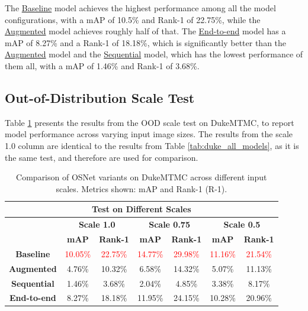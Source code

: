 \noindent The \hyperlink{model:baseline}{Baseline} model achieves the highest performance among all the model configurations, with a \acs{mAP} of 10.5\% and Rank-1 of 22.75\%, while the \hyperlink{model:augmented}{Augmented} model achieves roughly half of that. The \hyperlink{model:endtoend}{End-to-end} model has a \acs{mAP} of 8.27\% and a Rank-1 of 18.18\%, which is significantly better than the \hyperlink{model:augmented}{Augmented} model and the \hyperlink{model:sequential}{Sequential} model, which has the lowest performance of them all, with a \acs{mAP} of 1.46\% and Rank-1 of 3.68\%.

\subsection*{Out-of-Distribution Scale Test}

Table \ref{tab:scale_test} presents the results from the \acs{OOD} scale test on \acs{DukeMTMC}, to report model performance across varying input image sizes. The results from the scale 1.0 column are identical to the results from Table \ref{tab:duke_all_models}, as it is the same test, and therefore are used for comparison. 

\begin{table}[H]
\centering
\begin{tabular}{|c
                |c|c
                |c|c
                |c|c|}
\hline
\multicolumn{7}{|c|}{\cellcolor[HTML]{D8E9F7}\textbf{Test on Different Scales}} \\
\hline
\rowcolor[HTML]{D8E9F7} 
& \multicolumn{2}{c|}{\textbf{Scale 1.0}} 
& \multicolumn{2}{c|}{\textbf{Scale 0.75}} 
& \multicolumn{2}{c|}{\textbf{Scale 0.5}} \\
\hline
\rowcolor[HTML]{D8E9F7}
& \textbf{\acs{mAP}}& \textbf{Rank-1}
& \textbf{\acs{mAP}}& \textbf{Rank-1}
& \textbf{\acs{mAP}}& \textbf{Rank-1} \\
\hline
\textbf{Baseline} 
& \textcolor{red}{10.05\%} & \textcolor{red}{22.75\%}
& \textcolor{red}{14.77\%} & \textcolor{red}{29.98\%}
& \textcolor{red}{11.16\%} & \textcolor{red}{21.54\%} \\
\hline
\textbf{Augmented} 
& 4.76\%& 10.32\%& 6.58\%& 14.32\%& 5.07\%& 11.13\%\\
\hline
\textbf{Sequential} 
& 1.46\%& 3.68\%& 2.04\%& 4.85\%& 3.38\%& 8.17\%\\
\hline
\textbf{End-to-end} 
& 8.27\%& 18.18\%& 11.95\%& 24.15\%& 10.28\%& 20.96\%\\
\hline
\end{tabular}
\caption{Comparison of \acs{OSNet} variants on \acs{DukeMTMC} across different input scales. Metrics shown: \acs{mAP} and Rank-1 (R-1).}
\label{tab:scale_test}
\end{table}

